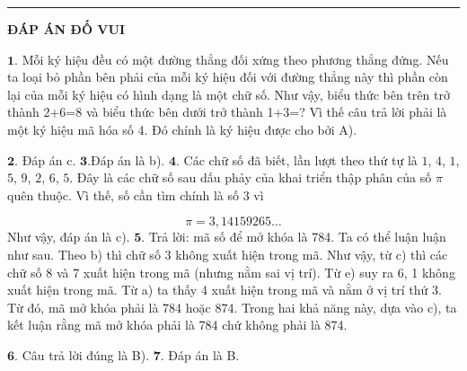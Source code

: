 \rule{1\textwidth}{0.1pt}
\begin{center}
	\textbf{ĐÁP ÁN ĐỐ VUI}
\end{center}

$\pmb{1.}$
Mỗi ký hiệu đều có một đường thẳng đối xứng theo phương thẳng đứng. Nếu ta loại bỏ phần bên phải của mỗi ký hiệu đối với đường thẳng này thì phần còn lại của mỗi ký hiệu có hình dạng là một chữ số. Như vậy, biểu thức bên trên trở thành 2+6=8 và biểu thức bên dưới trở thành 1+3=? Vì thế câu trả lời phải là một ký hiệu mã hóa số 4. Đó chính là ký hiệu được cho bởi A).
\vskip 0.1cm

$\pmb{2.}$ Đáp án c.
\vskip 0.1cm
$\pmb{3.}$Đáp án là b).
\vskip 0.1cm
$\pmb{4.}$ Các chữ số đã biết, lần lượt theo thứ tự là $1$, $4$, $1$, $5$, $9$, $2$, $6$, $5$. Đây là các chữ số sau dấu phảy của khai triển thập phân của số $\pi$ quên thuộc. Vì thế, số cần tìm chính là số $3$ vì

$$\pi = 3, 14159265\ldots$$
Như vậy, đáp án là c).
\vskip 0.1cm
$\pmb{5.}$ Trả lời: mã số để mở khóa là 784.
\vskip 0.1cm
Ta có thể luận luận như sau. Theo b) thì chữ số  3  không xuất hiện trong mã. Như vậy, từ c) thì các chữ số  8 và 7 xuất hiện trong mã (nhưng nằm sai vị trí). Từ e) suy ra 6, 1 không xuất hiện trong mã. Từ a)  ta thấy 4 xuất hiện trong mã và nằm ở vị trí thứ 3. Từ đó, mã mở khóa phải là 784 hoặc 874. Trong hai khả năng này, dựa vào c), ta kết luận rằng mã mở khóa phải là 784 chứ không phải là 874.
\vskip 0.1cm

$\pmb{6.}$ Câu trả lời đúng là B).
\vskip 0.1cm
$\pmb{7.}$ Đáp án là B.


